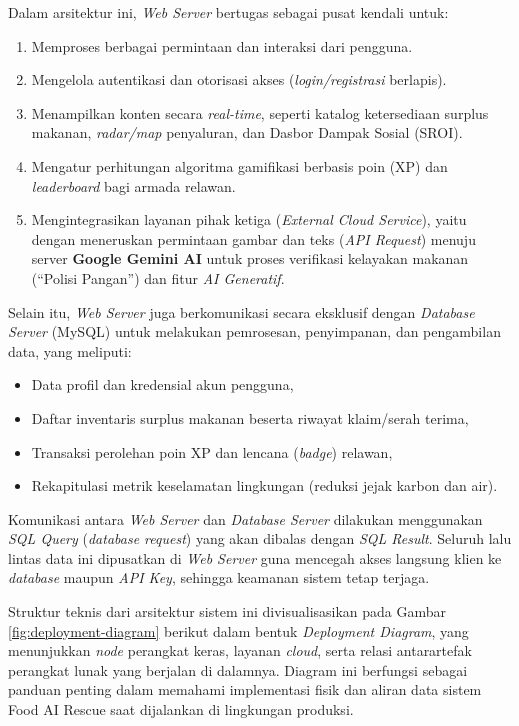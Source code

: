 Dalam arsitektur ini, \textit{Web Server} bertugas sebagai pusat kendali untuk:
\begin{enumerate}
    \item Memproses berbagai permintaan dan interaksi dari pengguna.
    \item Mengelola autentikasi dan otorisasi akses (\textit{login/registrasi} berlapis).
    \item Menampilkan konten secara \textit{real-time}, seperti katalog ketersediaan surplus makanan, \textit{radar/map} penyaluran, dan Dasbor Dampak Sosial (SROI).
    \item Mengatur perhitungan algoritma gamifikasi berbasis poin (XP) dan \textit{leaderboard} bagi armada relawan.
    \item Mengintegrasikan layanan pihak ketiga (\textit{External Cloud Service}), yaitu dengan meneruskan permintaan gambar dan teks (\textit{API Request}) menuju server \textbf{Google Gemini AI} untuk proses verifikasi kelayakan makanan (``Polisi Pangan'') dan fitur \textit{AI Generatif}.
\end{enumerate}

Selain itu, \textit{Web Server} juga berkomunikasi secara eksklusif dengan \textit{Database Server} (MySQL) untuk melakukan pemrosesan, penyimpanan, dan pengambilan data, yang meliputi:
\begin{itemize}
    \item Data profil dan kredensial akun pengguna,
    \item Daftar inventaris surplus makanan beserta riwayat klaim/serah terima,
    \item Transaksi perolehan poin XP dan lencana (\textit{badge}) relawan,
    \item Rekapitulasi metrik keselamatan lingkungan (reduksi jejak karbon dan air).
\end{itemize}

Komunikasi antara \textit{Web Server} dan \textit{Database Server} dilakukan menggunakan \textit{SQL Query} (\textit{database request}) yang akan dibalas dengan \textit{SQL Result}. Seluruh lalu lintas data ini dipusatkan di \textit{Web Server} guna mencegah akses langsung klien ke \textit{database} maupun \textit{API Key}, sehingga keamanan sistem tetap terjaga.

Struktur teknis dari arsitektur sistem ini divisualisasikan pada Gambar \ref{fig:deployment-diagram} berikut dalam bentuk \textit{Deployment Diagram}, yang menunjukkan \textit{node} perangkat keras, layanan \textit{cloud}, serta relasi antarartefak perangkat lunak yang berjalan di dalamnya. Diagram ini berfungsi sebagai panduan penting dalam memahami implementasi fisik dan aliran data sistem Food AI Rescue saat dijalankan di lingkungan produksi.

